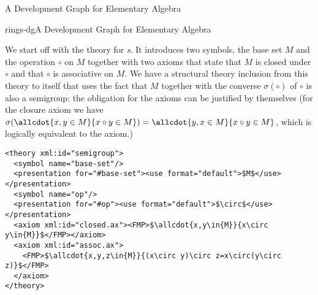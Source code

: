 \begin{omgroup}[id=dg-elal]{A Development Graph for Elementary Algebra}
\begin{myfig}{rings-dg}{A Development Graph for Elementary Algebra}
\end{myfig}

We start off with the theory for {\emph{s}}. It introduces two
symbols, the base set $M$ and the operation $\circ$ on $M$ together with two axioms that
state that $M$ is closed under $\circ$ and that $\circ$ is associative on $M$. We have a
structural theory inclusion from this theory to itself that uses the fact that $M$
together with the converse $\sigma(\circ)$ of $\circ$ is also a semigroup: the obligation
for the axioms can be justified by themselves (for the closure axiom we have
$\sigma(\allcdot{x,y\in{M}}{x\circ y\in{M}})=\allcdot{y,x\in{M}}{x\circ y\in{M}}$, which
is logically equivalent to the axiom.)

\begin{lstlisting}[mathescape,
  index={theory-inclusion,morphism,requation}]
<theory xml:id="semigroup">
  <symbol name="base-set"/>
  <presentation for="#base-set"><use format="default">$M$</use></presentation>
  <symbol name="op"/>
  <presentation for="#op"><use format="default">$\circ$</use></presentation>
  <axiom xml:id="closed.ax"><FMP>$\allcdot{x,y\in{M}}{x\circ y\in{M}}$</FMP></axiom>
  <axiom xml:id="assoc.ax">
    <FMP>$\allcdot{x,y,z\in{M}}{(x\circ y)\circ z=x\circ(y\circ z)}$</FMP>
  </axiom>
</theory>


\end{lstlisting}
\end{omgroup}
